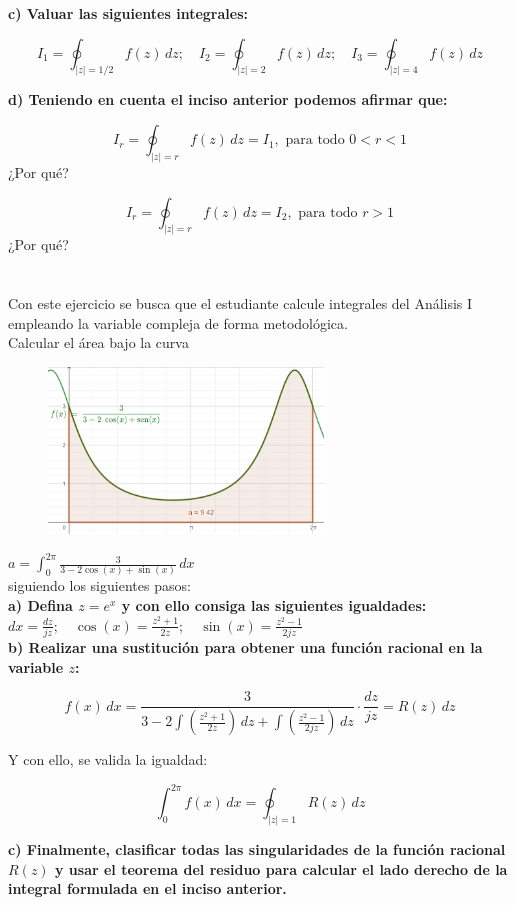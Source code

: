\documentclass[12pt]{report}
\begin{document}
\textbf{c)  Valuar las siguientes integrales:}

$$ I_1 = \oint_{|z| = 1/2} f(z) \, dz; \quad I_2 = \oint_{|z| = 2} f(z) \, dz; \quad I_3 = \oint_{|z| = 4} f(z) \, dz $$

\textbf{d)  Teniendo en cuenta el inciso anterior podemos afirmar que:}

$$ I_r = \oint_{|z| = r} f(z) \, dz = I_1, \text{ para todo } 0 < r < 1 $$ ¿Por qué?

$$ I_r = \oint_{|z| = r} f(z) \, dz = I_2, \text{ para todo } r > 1 $$ ¿Por qué?

\chapter{}%

    Con este ejercicio se busca que el estudiante calcule integrales del Análisis I empleando la variable compleja de forma metodológica.\\

Calcular el área bajo la curva\\


\begin{figure}[h] %
    \centering %
    \includegraphics[width=0.65\textwidth]{./Imagenes/foto1Ej7.png} %
\end{figure}

$a = \int_{0}^{2\pi} \frac{3}{3 - 2\cos(x) + \sin(x)} \, dx$\\[6pt]

siguiendo los siguientes pasos:\\[6pt]

\textbf{a)  Defina $z = e^{x}$ y con ello consiga las siguientes igualdades:}\\[6pt]

$dx = \frac{dz}{jz}; \quad \cos(x) = \frac{z^{2} + 1}{2z}; \quad \sin(x) = \frac{z^{2} - 1}{2jz}$\\[6pt]

\textbf{b)  Realizar una sustitución para obtener una función racional en la variable \( z \):}

$$ f(x) \, dx = \frac{3}{3 - 2\int \left( \frac{z^{2} + 1}{2z} \right) \, dz + \int \left( \frac{z^{2} - 1}{2jz} \right) \, dz} \cdot \frac{dz}{jz} = R(z) \, dz $$ 

Y con ello, se valida la igualdad:

$$ \int_{0}^{2\pi} f(x) \, dx = \oint_{|z|=1} R(z) \, dz$$ 


\textbf{c)  Finalmente, clasificar todas las singularidades de la función racional $R(z)$ y usar el teorema del residuo para calcular el lado derecho de la integral formulada en el inciso anterior.}
\end{document}
